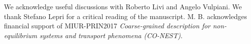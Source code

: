 \documentclass[iop, twocolumns, amssymb,notitlepage]{revtex4-1}
\begin{document}
\begin{acknowledgments}
We acknowledge useful discussions with Roberto Livi and Angelo Vulpiani. We thank Stefano Lepri 
for a critical reading of the manuscript.
M. B. acknowledges financial support of MIUR-PRIN2017 \textit{Coarse-grained description for non-equilibrium systems and transport phenomena (CO-NEST)}. 
\end{acknowledgments}





\end{document}
